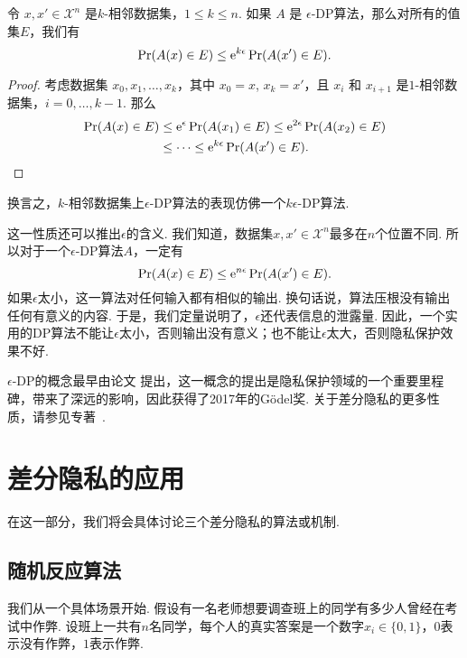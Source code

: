 \begin{proposition}[群体隐私]\label{prop:group-privacy}
    令 $x, x' \in \mathcal X^n$ 是$k$-相邻数据集，$1 \leq k \leq n$. 如果 $A$ 是 $\epsilon$-DP算法，那么对所有的值集$E$，我们有
    \[
    \Pr(A(x) \in E) \leq \mathrm{e}^{k\epsilon}\Pr(A(x') \in E).
    \]
\end{proposition}
\begin{proof}
    考虑数据集 $x_0, x_1, \dots , x_k$，其中 $x_0 = x$, $x_k = x'$，且 $x_i$ 和 $x_{i+1}$ 是$1$-相邻数据集，$i = 0, \dots, k-1$. 那么
    \[
    \begin{aligned}
    \Pr(A(x) \in E) &\leq \mathrm{e}^{\epsilon}\Pr(A(x_1) \in E) \leq \mathrm{e}^{2\epsilon}\Pr(A(x_2) \in E)\\
    &\leq \dots \leq \mathrm{e}^{k\epsilon}\Pr(A(x') \in E).
    \end{aligned}
    \]
\end{proof}

换言之，$k$-相邻数据集上$\epsilon$-DP算法的表现仿佛一个$k\epsilon$-DP算法. 

这一性质还可以推出$\epsilon$的含义. 我们知道，数据集$x, x' \in \mathcal X^n$最多在$n$个位置不同. 所以对于一个$\epsilon$-DP算法$A$，一定有
        \[
        \Pr(A(x) \in E) \leq \mathrm{e}^{n\epsilon}\Pr(A(x') \in E).
        \]
如果$\epsilon$太小，这一算法对任何输入都有相似的输出. 换句话说，算法压根没有输出任何有意义的内容. 于是，我们定量说明了，$\epsilon$还代表信息的泄露量. 因此，一个实用的DP算法不能让$\epsilon$太小，否则输出没有意义；也不能让$\epsilon$太大，否则隐私保护效果不好.

\begin{remark}
    $\epsilon$-DP的概念最早由论文 \cite{dworkCalibratingNoiseSensitivity2006} 提出，这一概念的提出是隐私保护领域的一个重要里程碑，带来了深远的影响，因此获得了2017年的Gödel奖. 关于差分隐私的更多性质，请参见专著~\cite{dworkAlgorithmicFoundationsDifferential2013}.
\end{remark}

\section{差分隐私的应用}
在这一部分，我们将会具体讨论三个差分隐私的算法或机制. 

\subsection{随机反应算法}
我们从一个具体场景开始. 假设有一名老师想要调查班上的同学有多少人曾经在考试中作弊. 设班上一共有$n$名同学，每个人的真实答案是一个数字$x_i \in \{0,1\}$，$0$表示没有作弊，$1$表示作弊. 

